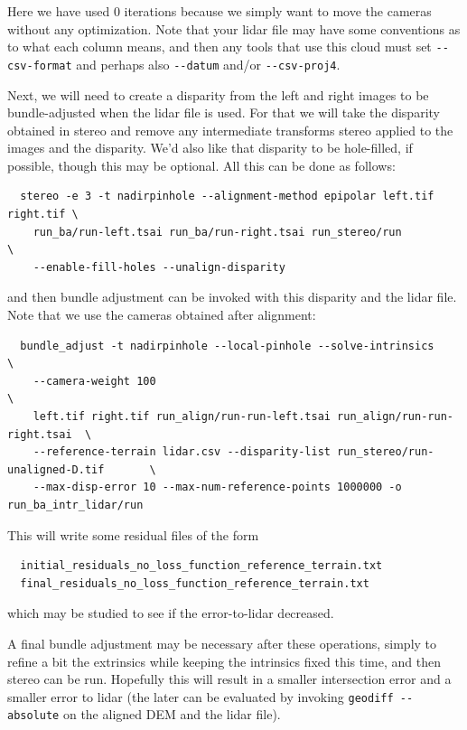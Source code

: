 Here we have used 0 iterations because we simply want to move the cameras
without any optimization. Note that your lidar file may have some conventions as to what each column
means, and then any tools that use this cloud must set \texttt{-\/-csv-format}
and perhaps also \texttt{-\/-datum} and/or \texttt{-\/-csv-proj4}. 

Next, we will need to create a disparity from the left and right images
to be bundle-adjusted when the lidar file is used. For that we will take the disparity obtained
in stereo and remove any intermediate transforms stereo applied to the
images and the disparity. We'd also like that disparity to be hole-filled, if possible, 
though this may be optional. All this can be done as follows:

\begin{verbatim}
  stereo -e 3 -t nadirpinhole --alignment-method epipolar left.tif right.tif \
    run_ba/run-left.tsai run_ba/run-right.tsai run_stereo/run                \
    --enable-fill-holes --unalign-disparity 
\end{verbatim}

and then bundle adjustment can be invoked with this disparity and
the lidar file. Note that we use the cameras obtained after alignment:

\begin{verbatim}
  bundle_adjust -t nadirpinhole --local-pinhole --solve-intrinsics               \
    --camera-weight 100                                                        \  
    left.tif right.tif run_align/run-run-left.tsai run_align/run-run-right.tsai  \
    --reference-terrain lidar.csv --disparity-list run_stereo/run-unaligned-D.tif       \
    --max-disp-error 10 --max-num-reference-points 1000000 -o run_ba_intr_lidar/run
\end{verbatim}

This will write some residual files of the form 
\begin{verbatim}
  initial_residuals_no_loss_function_reference_terrain.txt
  final_residuals_no_loss_function_reference_terrain.txt
\end{verbatim}

which may be studied to see if the error-to-lidar decreased.

A final bundle adjustment may be necessary after these operations,
simply to refine a bit the extrinsics while keeping the intrinsics
fixed this time, and then stereo can be run. Hopefully this will
result in a smaller intersection error and a smaller error to lidar
(the later can be evaluated by invoking \texttt{geodiff -\/-absolute}
on the aligned DEM and the lidar file). 

